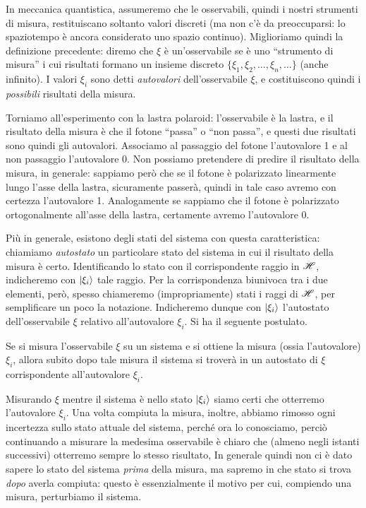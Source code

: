 In meccanica quantistica, assumeremo che le osservabili, quindi i nostri strumenti di misura, restituiscano soltanto valori discreti (ma non c'è da preoccuparsi: lo spaziotempo è ancora considerato uno spazio continuo).
Miglioriamo quindi la definizione precedente: diremo che $\xi$ è un'osservabile se è uno ``strumento di misura'' i cui risultati formano un insieme discreto $\{\xi_1,\xi_2,\dots,\xi_n,\dots\}$ (anche infinito).
I valori $\xi_i$ sono detti \emph{autovalori} dell'osservabile $\xi$, e costituiscono quindi i \emph{possibili} risultati della misura.

Torniamo all'esperimento con la lastra polaroid: l'osservabile è la lastra, e il risultato della misura è che il fotone ``passa'' o ``non passa'', e questi due risultati sono quindi gli autovalori.
Associamo al passaggio del fotone l'autovalore 1 e al non passaggio l'autovalore 0.
Non possiamo pretendere di predire il risultato della misura, in generale: sappiamo però che se il fotone è polarizzato linearmente lungo l'asse della lastra, sicuramente passerà, quindi in tale caso avremo con certezza l'autovalore 1.
Analogamente se sappiamo che il fotone è polarizzato ortogonalmente all'asse della lastra, certamente avremo l'autovalore 0.

Più in generale, esistono degli stati del sistema con questa caratteristica: chiamiamo \emph{autostato} un particolare stato del sistema in cui il risultato della misura è certo.
Identificando lo stato con il corrispondente raggio in $\mathscr H$, indicheremo con $\lvert\xi_i\rangle$ tale raggio.
Per la corrispondenza biunivoca tra i due elementi, però, spesso chiameremo (impropriamente) stati i raggi di $\mathscr H$, per semplificare un poco la notazione.
Indicheremo dunque con $\lvert\xi_i\rangle$ l'autostato dell'osservabile $\xi$ relativo all'autovalore $\xi_i$.
Si ha il seguente postulato.
\begin{postulato}
    Se si misura l'osservabile $\xi$ su un sistema e si ottiene la misura (ossia l'autovalore) $\xi_i$, allora subito dopo tale misura il sistema si troverà in un autostato di $\xi$ corrispondente all'autovalore $\xi_i$.
\end{postulato}
Misurando $\xi$ mentre il sistema è nello stato $\lvert\xi_i\rangle$ siamo certi che otterremo l'autovalore $\xi_i$.
Una volta compiuta la misura, inoltre, abbiamo rimosso ogni incertezza sullo stato attuale del sistema, perch\'e ora lo conosciamo, perciò continuando a misurare la medesima osservabile è chiaro che (almeno negli istanti successivi) otterremo sempre lo stesso risultato,
In generale quindi non ci è dato sapere lo stato del sistema \emph{prima} della misura, ma sapremo in che stato si trova \emph{dopo} averla compiuta: questo è essenzialmente il motivo per cui, compiendo una misura, perturbiamo il sistema.

